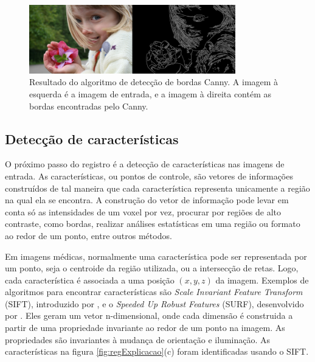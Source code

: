 \begin{figure}[H]
    \centering
    \includegraphics[width=0.8\textwidth]{figuras/canny.png}
    \caption{Resultado do algoritmo de detecção de bordas Canny. A imagem à
    esquerda é a imagem de entrada, e a imagem à direita contém as bordas
    encontradas pelo Canny.}
    \label{fig:edgeDetection}
\end{figure}


\subsection{Detecção de características}
\label{sec:dec_corr_carac}

  O próximo passo do registro é a detecção de características nas imagens de entrada.
As características, ou pontos de controle, são vetores de informações construídos
de tal maneira que cada característica representa unicamente a região na qual ela se
encontra. A construção do vetor de informação pode levar em conta só as intensidades
de um voxel por vez, procurar por regiões de alto contraste, como bordas, realizar
análises estatísticas em uma região ou formato ao redor de um ponto, entre outros
métodos.

  Em imagens médicas, normalmente uma característica pode ser representada por um ponto,
seja o centroide da região utilizada, ou a intersecção de retas. Logo, cada característica
é associada a uma posição $(x, y, z)$ da imagem. Exemplos de algoritmos para encontrar
características são \textit{Scale Invariant Feature Transform} (SIFT), introduzido por 
\cite{lowe2004distinctive}, e o \textit{Speeded Up Robust Features}
(SURF), desenvolvido por \cite{bay2008speeded}. Eles geram um vetor n-dimensional,
onde cada dimensão é construida a partir de uma propriedade invariante ao redor
de um ponto na imagem. As propriedades são invariantes à mudança de
orientação e iluminação. As características na figura \ref{fig:regExplicacao}(c) 
foram identificadas usando o SIFT.

